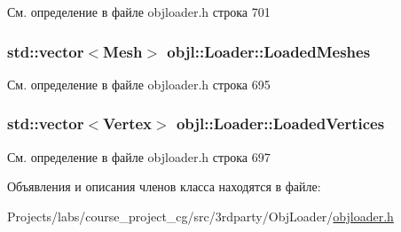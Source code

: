 См. определение в файле objloader.\+h строка 701

\subsubsection[{\texorpdfstring{Loaded\+Meshes}{LoadedMeshes}}]{\setlength{\rightskip}{0pt plus 5cm}std\+::vector$<${\bf Mesh}$>$ objl\+::\+Loader\+::\+Loaded\+Meshes}\hypertarget{classobjl_1_1_loader_aba5e73cc2c1d0a917415498723ea5702}{}\label{classobjl_1_1_loader_aba5e73cc2c1d0a917415498723ea5702}


См. определение в файле objloader.\+h строка 695

\subsubsection[{\texorpdfstring{Loaded\+Vertices}{LoadedVertices}}]{\setlength{\rightskip}{0pt plus 5cm}std\+::vector$<${\bf Vertex}$>$ objl\+::\+Loader\+::\+Loaded\+Vertices}\hypertarget{classobjl_1_1_loader_ada15ad9ce70b5c457907be7988436ed5}{}\label{classobjl_1_1_loader_ada15ad9ce70b5c457907be7988436ed5}


См. определение в файле objloader.\+h строка 697



Объявления и описания членов класса находятся в файле\+:\begin{DoxyCompactItemize}
\item 
Projects/labs/course\+\_\+project\+\_\+cg/src/3rdparty/\+Obj\+Loader/\hyperlink{3rdparty_2_obj_loader_2objloader_8h}{objloader.\+h}\end{DoxyCompactItemize}
